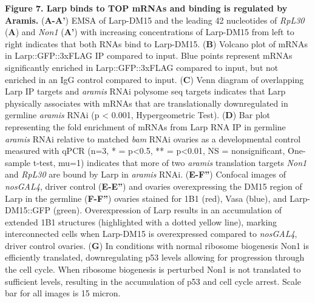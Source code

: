 \documentclass[12pt,twoside]{reedthesis}
\begin{document}
\textbf{Figure 7. Larp binds to TOP mRNAs and binding is regulated by
Aramis.} (\textbf{A-A'}) EMSA of Larp-DM15 and the leading 42 nucleotides of
\emph{RpL30} (\textbf{A}) and \emph{Non1} (\textbf{A'}) with increasing concentrations of
Larp-DM15 from left to right indicates that both RNAs bind to Larp-DM15.
(\textbf{B}) Volcano plot of mRNAs in Larp::GFP::3xFLAG IP compared to input.
Blue points represent mRNAs significantly enriched in Larp::GFP::3xFLAG
compared to input, but not enriched in an IgG control compared to input.
(\textbf{C}) Venn diagram of overlapping Larp IP targets and \emph{aramis} RNAi
polysome seq targets indicates that Larp physically associates with
mRNAs that are translationally downregulated in germline \emph{aramis} RNAi
(p \textless{} 0.001, Hypergeometric Test). (\textbf{D}) Bar plot representing the
fold enrichment of mRNAs from Larp RNA IP in germline \emph{aramis} RNAi
relative to matched \emph{bam} RNAi ovaries as a developmental control
measured with qPCR (n=3, * = p\textless0.5, ** = p\textless0.01, NS =
nonsignificant, One-sample t-test, mu=1) indicates that more of two
\emph{aramis} translation targets \emph{Non1} and \emph{RpL30} are bound by Larp in
\emph{aramis} RNAi. (\textbf{E-F''}) Confocal images of \emph{nosGAL4}, driver control
(\textbf{E-E''}) and ovaries overexpressing the DM15 region of Larp in the
germline (\textbf{F-F''}) ovaries stained for 1B1 (red), Vasa (blue), and
Larp-DM15::GFP (green). Overexpression of Larp results in an
accumulation of extended 1B1 structures (highlighted with a dotted
yellow line), marking interconnected cells when Larp-DM15 is
overexpressed compared to \emph{nosGAL4}, driver control ovaries. (\textbf{G}) In
conditions with normal ribosome biogenesis Non1 is efficiently
translated, downregulating p53 levels allowing for progression through
the cell cycle. When ribosome biogenesis is perturbed Non1 is not
translated to sufficient levels, resulting in the accumulation of p53
and cell cycle arrest. Scale bar for all images is 15 micron.
\end{document}

